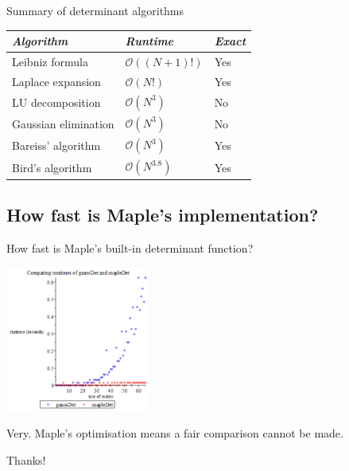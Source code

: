 \documentclass{beamer}
\begin{document}
\begin{frame}{Summary of determinant algorithms}
    \begin{center}{}
        \begin{tabular}{l l l}
            \toprule
            \emph{Algorithm}     & \emph{Runtime}           & \emph{Exact} \\
            \midrule
            Leibniz formula      & $\mathcal{O}((N+1)!)$    & Yes \\
            Laplace expansion    & $\mathcal{O}(N!)$        & Yes \\
            LU decomposition     & $\mathcal{O}(N^3)$       & No \\
            Gaussian elimination & $\mathcal{O}(N^3)$       & No \\
            Bareiss' algorithm   & $\mathcal{O}(N^3)$       & Yes \\
            Bird's algorithm     & $\mathcal{O}(N^{3.8})$ & Yes \\
            \bottomrule
        \end{tabular}
    \end{center}

\end{frame}

\subsection{How fast is Maple's implementation?}

\begin{frame}{How fast is Maple's built-in determinant function?}
    \begin{center}{}
        \includegraphics[height=180]{gauss-maple}
    \end{center}

    Very. Maple's optimisation means a fair comparison cannot be made.

\end{frame}

\begin{frame}{}
    \begin{center}{}
        \Huge{Thanks!}
    \end{center}
\end{frame}
\end{document}
